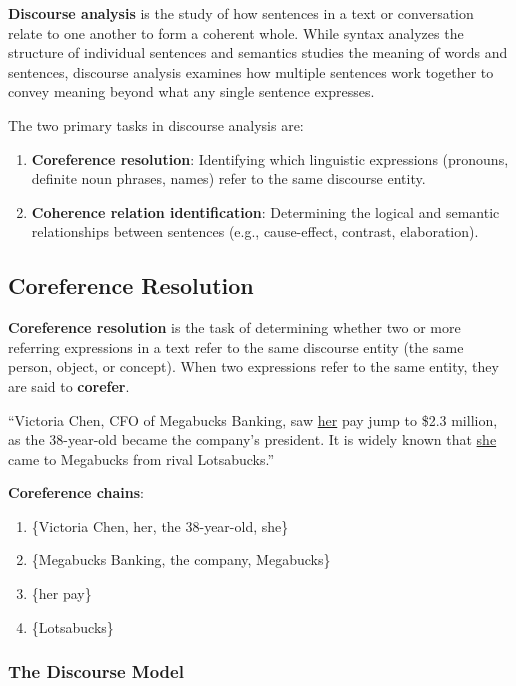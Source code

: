 \documentclass[11pt,a4paper]{article}
\begin{document}
\textbf{Discourse analysis} is the study of how sentences in a text or conversation relate to one another to form a coherent whole. While syntax analyzes the structure of individual sentences and semantics studies the meaning of words and sentences, discourse analysis examines how multiple sentences work together to convey meaning beyond what any single sentence expresses.

The two primary tasks in discourse analysis are:
\begin{enumerate}
    \item \textbf{Coreference resolution}: Identifying which linguistic expressions (pronouns, definite noun phrases, names) refer to the same discourse entity.
    \item \textbf{Coherence relation identification}: Determining the logical and semantic relationships between sentences (e.g., cause-effect, contrast, elaboration).
\end{enumerate}

\subsection{Coreference Resolution}

\textbf{Coreference resolution} is the task of determining whether two or more referring expressions in a text refer to the same discourse entity (the same person, object, or concept). When two expressions refer to the same entity, they are said to \textbf{corefer}.

\begin{tcolorbox}[colback=green!5!white,colframe=green!75!black,title=\textbf{Example: Coreference Chain}]
``Victoria Chen, CFO of Megabucks Banking, saw \underline{her} pay jump to \$2.3 million, as the 38-year-old became the company's president. It is widely known that \underline{she} came to Megabucks from rival Lotsabucks.''

\textbf{Coreference chains}:
\begin{enumerate}
    \item \{Victoria Chen, her, the 38-year-old, she\}
    \item \{Megabucks Banking, the company, Megabucks\}
    \item \{her pay\}
    \item \{Lotsabucks\}
\end{enumerate}
\end{tcolorbox}

\subsubsection{The Discourse Model}
\end{document}
